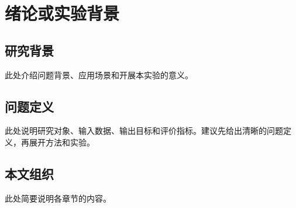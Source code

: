 \chapter{绪论或实验背景}

\section{研究背景}

此处介绍问题背景、应用场景和开展本实验的意义。

\section{问题定义}

此处说明研究对象、输入数据、输出目标和评价指标。建议先给出清晰的问题定义，再展开方法和实验。

\section{本文组织}

此处简要说明各章节的内容。
